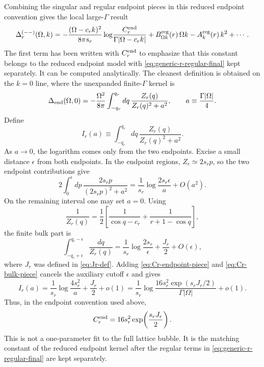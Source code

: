 \documentclass[aps,prx,preprint,amsmath,amssymb]{revtex4-2}
\begin{document}
Combining the singular and regular endpoint pieces in this reduced endpoint
convention gives the local large-\(\Gamma\) result
\begin{equation}
\label{eq:generic-r-full-local-endpoint}
\Delta_r^{(--)}(\Omega,k)
=
-\frac{(\Omega-c_r k)^2}{8\pi s_r}
\log\!\frac{C_r^{\rm end}}{\Gamma|\Omega-c_r k|}
+B_{\Omega k}^{\rm reg}(r)\,\Omega k
-A_k^{\rm reg}(r)\,k^2
+\cdots.
\end{equation}
The first term has been written with \(C_r^{\rm end}\) to emphasize that this
constant belongs to the reduced endpoint model with
\eqref{eq:generic-r-regular-final} kept separately.  It can be computed
analytically.  The cleanest definition is obtained on the \(k=0\) line, where
the unexpanded finite-\(\Gamma\) kernel is
\begin{equation}
\label{eq:Cr-end-kernel}
\Delta_{\rm end}(\Omega,0)
=
-\frac{\Omega^2}{8\pi}
\int_{-q_r}^{q_r}dq\,
\frac{Z_r(q)}
{Z_r(q)^2+a^2},
\qquad
a\equiv \frac{\Gamma|\Omega|}{4}.
\end{equation}
Define
\begin{equation}
\label{eq:Ia-def}
I_r(a)\equiv
\int_{-q_r}^{q_r}dq\,
\frac{Z_r(q)}{Z_r(q)^2+a^2}.
\end{equation}
As \(a\to0\), the logarithm comes only from the two endpoints.  Excise a small
distance \(\epsilon\) from both endpoints.  In the endpoint regions,
\(Z_r\simeq 2s_r p\), so the two endpoint contributions give
\begin{equation}
\label{eq:Cr-endpoint-piece}
2\int_0^\epsilon dp\,
\frac{2s_r p}{(2s_r p)^2+a^2}
=
\frac{1}{s_r}\log\frac{2s_r\epsilon}{a}+O(a^2).
\end{equation}
On the remaining interval one may set \(a=0\).  Using
\[
\frac{1}{Z_r(q)}
=
\frac{1}{2}\left[
\frac{1}{\cos q-c_r}
+\frac{1}{r+1-\cos q}
\right],
\]
the finite bulk part is
\begin{equation}
\label{eq:Cr-bulk-piece}
\int_{-q_r+\epsilon}^{q_r-\epsilon}\frac{dq}{Z_r(q)}
=
\frac{1}{s_r}\log\frac{2s_r}{\epsilon}
+\frac{J_r}{2}
+O(\epsilon),
\end{equation}
where \(J_r\) was defined in \eqref{eq:Jr-def}.  Adding
\eqref{eq:Cr-endpoint-piece} and \eqref{eq:Cr-bulk-piece} cancels the auxiliary
cutoff \(\epsilon\) and gives
\begin{equation}
\label{eq:Ia-asymptotic}
I_r(a)
=
\frac{1}{s_r}\log\frac{4s_r^2}{a}
+\frac{J_r}{2}
+o(1)
=
\frac{1}{s_r}
\log\frac{16s_r^2\exp(s_rJ_r/2)}{\Gamma|\Omega|}
+o(1).
\end{equation}
Thus, in the endpoint convention used above,
\begin{equation}
\label{eq:Cr-end-result}
C_r^{\rm end}
=
16s_r^2\exp\!\left(\frac{s_rJ_r}{2}\right).
\end{equation}
This is not a one-parameter fit to the full lattice bubble.  It is the matching
constant of the reduced endpoint kernel after the regular terms in
\eqref{eq:generic-r-regular-final} are kept separately.
\end{document}
